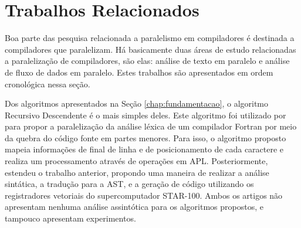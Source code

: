 
\newcommand{\sla}{\textbackslash}

\newcommand{\cmd}[1]{\textsf{#1}}

\newcommand{\pkg}[1]{\textsf{#1}}

\newcommand{\ltxcmd}[1]{\cmd{\sla{}#1}}

\chapter{Trabalhos Relacionados}
\label{chap:related_works}

Boa parte das pesquisa relacionada a paralelismo
em compiladores é destinada a compiladores que paralelizam.
Há basicamente
duas áreas de estudo relacionadas a paralelização de compiladores, são
elas: análise de texto em paralelo e análise de fluxo de dados em paralelo.
Estes trabalhos são apresentados em ordem cronológica nessa seção.

Dos algoritmos apresentados na Seção \ref{chap:fundamentacao}, o algoritmo
Recursivo Descendente é o mais simples deles. Este algoritmo foi utilizado por \cite{Lincoln:1970:PPT:987475.987478}
para propor a paralelização da análise léxica de um compilador
Fortran por meio da quebra do código fonte em partes menores. Para isso, o algoritmo proposto mapeia informações de final de
linha e de posicionamento de cada caractere e realiza um processamento através de operações em APL.
Posteriormente, \cite{Krohn:1975:PAC:390015.808414} estendeu o trabalho
anterior, propondo uma maneira de realizar a análise sintática, a
tradução para a AST, e a geração
de código utilizando os registradores vetoriais do supercomputador
STAR-100. Ambos os artigos não apresentam nenhuma
análise assintótica para os algoritmos propostos, e tampouco apresentam
experimentos. 

